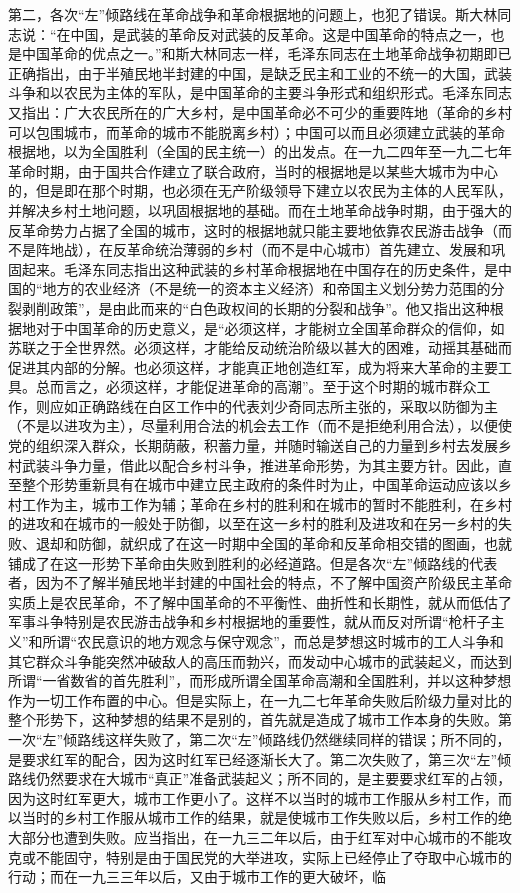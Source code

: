 第二，各次“左”倾路线在革命战争和革命根据地的问题上，也犯了错误。斯大林同志说：“在中国，是武装的革命反对武装的反革命。这是中国革命的特点之一，也是中国革命的优点之一。”和斯大林同志一样，毛泽东同志在土地革命战争初期即已正确指出，由于半殖民地半封建的中国，是缺乏民主和工业的不统一的大国，武装斗争和以农民为主体的军队，是中国革命的主要斗争形式和组织形式。毛泽东同志又指出：广大农民所在的广大乡村，是中国革命必不可少的重要阵地（革命的乡村可以包围城市，而革命的城市不能脱离乡村）；中国可以而且必须建立武装的革命根据地，以为全国胜利（全国的民主统一）的出发点。在一九二四年至一九二七年革命时期，由于国共合作建立了联合政府，当时的根据地是以某些大城市为中心的，但是即在那个时期，也必须在无产阶级领导下建立以农民为主体的人民军队，并解决乡村土地问题，以巩固根据地的基础。而在土地革命战争时期，由于强大的反革命势力占据了全国的城市，这时的根据地就只能主要地依靠农民游击战争（而不是阵地战），在反革命统治薄弱的乡村（而不是中心城市）首先建立、发展和巩固起来。毛泽东同志指出这种武装的乡村革命根据地在中国存在的历史条件，是中国的“地方的农业经济（不是统一的资本主义经济）和帝国主义划分势力范围的分裂剥削政策”，是由此而来的“白色政权间的长期的分裂和战争”。他又指出这种根据地对于中国革命的历史意义，是“必须这样，才能树立全国革命群众的信仰，如苏联之于全世界然。必须这样，才能给反动统治阶级以甚大的困难，动摇其基础而促进其内部的分解。也必须这样，才能真正地创造红军，成为将来大革命的主要工具。总而言之，必须这样，才能促进革命的高潮”。至于这个时期的城市群众工作，则应如正确路线在白区工作中的代表刘少奇同志所主张的，采取以防御为主（不是以进攻为主），尽量利用合法的机会去工作（而不是拒绝利用合法），以便使党的组织深入群众，长期荫蔽，积蓄力量，并随时输送自己的力量到乡村去发展乡村武装斗争力量，借此以配合乡村斗争，推进革命形势，为其主要方针。因此，直至整个形势重新具有在城市中建立民主政府的条件时为止，中国革命运动应该以乡村工作为主，城市工作为辅；革命在乡村的胜利和在城市的暂时不能胜利，在乡村的进攻和在城市的一般处于防御，以至在这一乡村的胜利及进攻和在另一乡村的失败、退却和防御，就织成了在这一时期中全国的革命和反革命相交错的图画，也就铺成了在这一形势下革命由失败到胜利的必经道路。但是各次“左”倾路线的代表者，因为不了解半殖民地半封建的中国社会的特点，不了解中国资产阶级民主革命实质上是农民革命，不了解中国革命的不平衡性、曲折性和长期性，就从而低估了军事斗争特别是农民游击战争和乡村根据地的重要性，就从而反对所谓“枪杆子主义”和所谓“农民意识的地方观念与保守观念”，而总是梦想这时城市的工人斗争和其它群众斗争能突然冲破敌人的高压而勃兴，而发动中心城市的武装起义，而达到所谓“一省数省的首先胜利”，而形成所谓全国革命高潮和全国胜利，并以这种梦想作为一切工作布置的中心。但是实际上，在一九二七年革命失败后阶级力量对比的整个形势下，这种梦想的结果不是别的，首先就是造成了城市工作本身的失败。第一次“左”倾路线这样失败了，第二次“左”倾路线仍然继续同样的错误；所不同的，是要求红军的配合，因为这时红军已经逐渐长大了。第二次失败了，第三次“左”倾路线仍然要求在大城市“真正”准备武装起义；所不同的，是主要要求红军的占领，因为这时红军更大，城市工作更小了。这样不以当时的城市工作服从乡村工作，而以当时的乡村工作服从城市工作的结果，就是使城市工作失败以后，乡村工作的绝大部分也遭到失败。应当指出，在一九三二年以后，由于红军对中心城市的不能攻克或不能固守，特别是由于国民党的大举进攻，实际上已经停止了夺取中心城市的行动；而在一九三三年以后，又由于城市工作的更大破坏，临